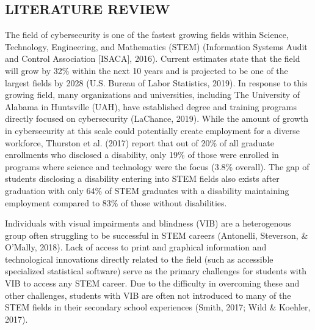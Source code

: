 \documentclass[11.5pt]{sig-alternate} %
\begin{document}
\begin{large}
\section*{LITERATURE REVIEW}

The field of cybersecurity is one of the fastest growing fields within Science, Technology, Engineering, and Mathematics (STEM) (Information Systems Audit and Control Association [ISACA], 2016). Current estimates state that the field will grow by 32\% within the next 10 years and is projected to be one of the largest fields by 2028 (U.S. Bureau of Labor Statistics, 2019). In response to this growing field, many organizations and universities, including The University of Alabama in Huntsville (UAH), have established degree and training programs directly focused on cybersecurity (LaChance, 2019). While the amount of growth in cybersecurity at this scale could potentially create employment for a diverse workforce, Thurston et al. (2017) report that out of 20\% of all graduate enrollments who disclosed a disability, only 19\% of those were enrolled in programs where science and technology were the focus (3.8\% overall). The gap of students disclosing a disability entering into STEM fields also exists after graduation with only 64\% of STEM graduates with a disability maintaining employment compared to 83\% of those without disabilities.
        	
Individuals with visual impairments and blindness (VIB) are a heterogenous group often struggling to be successful in STEM careers (Antonelli, Steverson, \& O’Mally, 2018). Lack of access to print and graphical information and technological innovations directly related to the field (such as accessible specialized statistical software) serve as the primary challenges for students with VIB to access any STEM career. Due to the difficulty in overcoming these and other challenges, students with VIB are often not introduced to many of the STEM fields in their secondary school experiences (Smith, 2017; Wild \& Koehler, 2017).
        	

\end{large}
\end{document}
